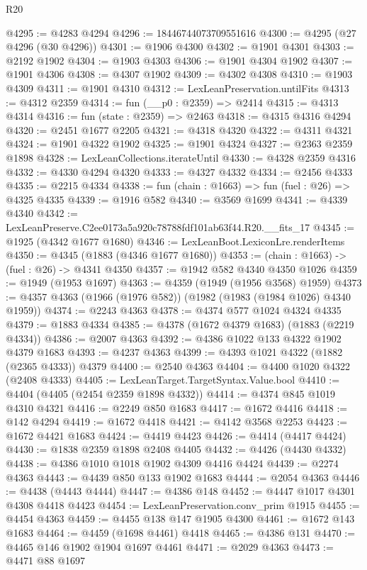 \begin{lexlean}{R20}
\begin{coremodule}
@4295 := @4283 @4294
@4296 := 18446744073709551616
@4300 := @4295 (@27 @4296 (@30 @4296))
@4301 := @1906 @4300
@4302 := @1901 @4301
@4303 := @2192 @1902
@4304 := @1903 @4303
@4306 := @1901 @4304 @1902
@4307 := @1901 @4306
@4308 := @4307 @1902
@4309 := @4302 @4308
@4310 := @1903 @4309
@4311 := @1901 @4310
@4312 := LexLeanPreservation.untilFits
@4313 := @4312 @2359
@4314 := fun (__p0 : @2359) => @2414
@4315 := @4313 @4314
@4316 := fun (state : @2359) => @2463
@4318 := @4315 @4316 @4294
@4320 := @2451 @1677 @2205
@4321 := @4318 @4320
@4322 := @4311 @4321
@4324 := @1901 @4322 @1902
@4325 := @1901 @4324
@4327 := @2363 @2359 @1898
@4328 := LexLeanCollections.iterateUntil
@4330 := @4328 @2359 @4316
@4332 := @4330 @4294 @4320
@4333 := @4327 @4332
@4334 := @2456 @4333
@4335 := @2215 @4334
@4338 := fun (chain : @1663) => fun (fuel : @26) => @4325 @4335
@4339 := @1916 @582
@4340 := @3569 @1699
@4341 := @4339 @4340
@4342 := LexLeanPreserve.C2ee0173a5a920c78788fdf101ab63f44.R20.__fits_17
@4345 := @1925 (@4342 @1677 @1680)
@4346 := LexLeanBoot.LexiconLre.renderItems
@4350 := @4345 (@1883 (@4346 @1677 @1680))
@4353 := (chain : @1663) -> (fuel : @26) -> @4341 @4350
@4357 := @1942 @582 @4340 @4350 @1026
@4359 := @1949 (@1953 @1697)
@4363 := @4359 (@1949 (@1956 @3568) @1959)
@4373 := @4357 @4363 (@1966 (@1976 @582)) (@1982 (@1983 (@1984 @1026) @4340 @1959))
@4374 := @2243 @4363
@4378 := @4374 @577 @1024 @4324 @4335
@4379 := @1883 @4334
@4385 := @4378 (@1672 @4379 @1683) (@1883 (@2219 @4334))
@4386 := @2007 @4363
@4392 := @4386 @1022 @133 @4322 @1902 @4379 @1683
@4393 := @4237 @4363
@4399 := @4393 @1021 @4322 (@1882 (@2365 @4333)) @4379
@4400 := @2540 @4363
@4404 := @4400 @1020 @4322 (@2408 @4333)
@4405 := LexLeanTarget.TargetSyntax.Value.bool
@4410 := @4404 (@4405 (@2454 @2359 @1898 @4332))
@4414 := @4374 @845 @1019 @4310 @4321
@4416 := @2249 @850 @1683
@4417 := @1672 @4416
@4418 := @142 @4294
@4419 := @1672 @4418
@4421 := @4142 @3568 @2253
@4423 := @1672 @4421 @1683
@4424 := @4419 @4423
@4426 := @4414 (@4417 @4424)
@4430 := @1838 @2359 @1898 @2408 @4405
@4432 := @4426 (@4430 @4332)
@4438 := @4386 @1010 @1018 @1902 @4309 @4416 @4424
@4439 := @2274 @4363
@4443 := @4439 @850 @133 @1902 @1683
@4444 := @2054 @4363
@4446 := @4438 (@4443 @4444)
@4447 := @4386 @148
@4452 := @4447 @1017 @4301 @4308 @4418 @4423
@4454 := LexLeanPreservation.conv_prim @1915
@4455 := @4454 @4363
@4459 := @4455 @138 @147 @1905 @4300
@4461 := @1672 @143 @1683
@4464 := @4459 (@1698 @4461) @4418
@4465 := @4386 @131
@4470 := @4465 @146 @1902 @1904 @1697 @4461
@4471 := @2029 @4363
@4473 := @4471 @88 @1697

\end{coremodule}
\end{lexlean}
